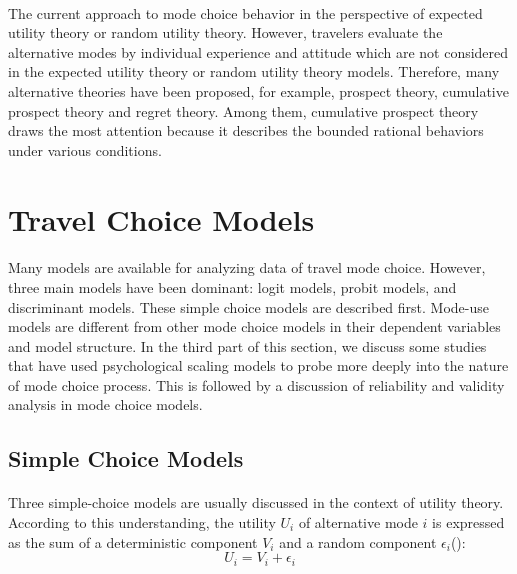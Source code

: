 


\paragraph{}The current approach to mode choice behavior
in the perspective of expected utility theory or random utility theory. However, travelers evaluate the alternative modes by individual experience and attitude which are not considered in the expected utility theory or random utility theory models. Therefore, many alternative theories have been proposed, for example, prospect theory, cumulative prospect theory and regret theory. Among them, cumulative prospect theory draws the most attention because it describes the bounded rational behaviors under various conditions.

\clearpage
\section{Travel Choice Models}
\paragraph{}Many models are available for analyzing data of travel mode choice. However, three main models have been dominant: logit models, probit models, and discriminant models. These simple choice models are described first. Mode-use models are different from other mode choice models in their dependent variables and model structure. In the third part of this section, we discuss some studies that have used psychological scaling models to probe more deeply into the nature of mode choice process. This is followed by a discussion of reliability and validity analysis in mode choice models.

\subsection{Simple Choice Models}
\paragraph{}Three simple-choice models are usually discussed in the context of utility theory. According to this understanding, the utility $U_i$ of alternative mode $i$ is expressed as the sum of a deterministic component $V_i$ and a random component $\epsilon_i$(\cite{Richard, David, 1982}):
\begin{equation}
U_i = V_i + \epsilon_i
\end{equation}
